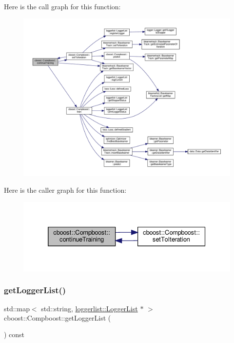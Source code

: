 Here is the call graph for this function\+:
\nopagebreak
\begin{figure}[H]
\begin{center}
\leavevmode
\includegraphics[width=350pt]{classcboost_1_1_compboost_a0e72bc9f0d36d4a9f141978e445f2cdc_cgraph}
\end{center}
\end{figure}
Here is the caller graph for this function\+:
\nopagebreak
\begin{figure}[H]
\begin{center}
\leavevmode
\includegraphics[width=332pt]{classcboost_1_1_compboost_a0e72bc9f0d36d4a9f141978e445f2cdc_icgraph}
\end{center}
\end{figure}
\mbox{\label{classcboost_1_1_compboost_a0376256bdfde1a50b420ad7412f4b4dd}} 
\subsubsection{\texorpdfstring{get\+Logger\+List()}{getLoggerList()}}
{\footnotesize\ttfamily std\+::map$<$ std\+::string, \hyperlink{classloggerlist_1_1_logger_list}{loggerlist\+::\+Logger\+List} $\ast$ $>$ cboost\+::\+Compboost\+::get\+Logger\+List (\begin{DoxyParamCaption}{ }\end{DoxyParamCaption}) const}

